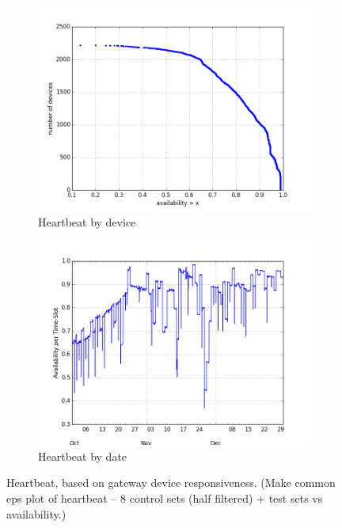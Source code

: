 \begin{figure}[ht!]
\begin{minipage}{1\linewidth}
\centering
%
\begin{subfigure}[b]{0.5\linewidth}
\includegraphics[width=\linewidth]{figures/250-test_dw-availability-CDF.png}
  \caption{Heartbeat by device}
  \label{fig:availability-device}
\end{subfigure}
%
\hspace{-1em}
%
\begin{subfigure}[b]{0.5\linewidth}
\includegraphics[width=\linewidth]{figures/250-test_dw-availability-by-date.png}
  \caption{Heartbeat by date}
  \label{fig:availability-date}
\end{subfigure}
%
\end{minipage}
\caption{Heartbeat, based on gateway device responsiveness. (Make common eps 
plot of heartbeat -- 8 control sets (half filtered) + test sets vs 
availability.) }
\label{fig:availability}
\end{figure}


